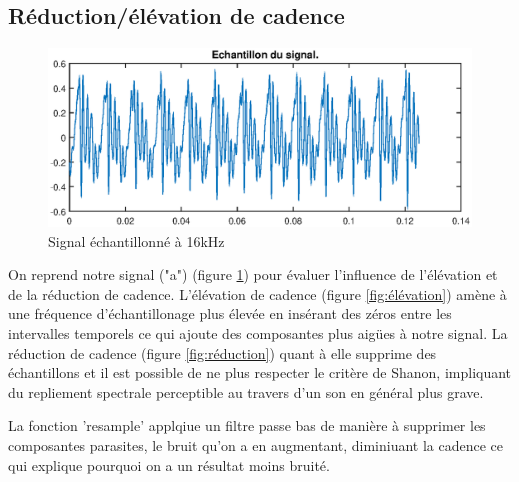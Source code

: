 \documentclass[french]{article}
\begin{document}
\FloatBarrier
\subsection{Réduction/élévation de cadence}

\begin{figure}[h!]
	\centering
	\includegraphics[width=\textwidth]{images/cadence_signal.eps}
	\caption{Signal échantillonné à 16kHz}
	\label{fig:cadence_signal}
\end{figure}

On reprend notre signal ("a") (figure \ref{fig:cadence_signal}) pour évaluer l'influence de l'élévation et de la réduction de cadence.
L'élévation de cadence (figure \ref{fig:élévation}) amène à une fréquence d'échantillonage plus élevée en insérant des zéros entre les intervalles temporels ce qui ajoute des composantes plus aigües à notre signal. La réduction de cadence (figure \ref{fig:réduction}) quant à elle supprime des échantillons et il est possible de ne plus respecter le critère de Shanon, impliquant du repliement spectrale perceptible au travers d'un son en général plus grave.

La fonction 'resample' applqiue un filtre passe bas de manière à supprimer les composantes parasites, le bruit qu'on a en augmentant, diminiuant la cadence ce qui explique pourquoi on a un résultat moins bruité.
\end{document}

